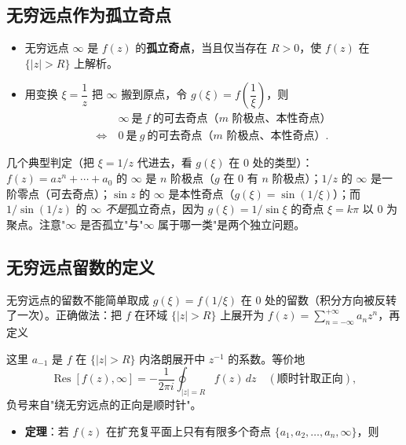 \subsection{无穷远点作为孤立奇点}

\begin{itemize}
    \item 无穷远点 \(\infty\) 是 \(f(z)\) 的\textbf{孤立奇点}，当且仅当存在 \(R>0\)，使 \(f(z)\) 在 \(\{|z|>R\}\) 上解析。
    \item 用变换 \(\xi=\dfrac{1}{z}\) 把 \(\infty\) 搬到原点，令 \(g(\xi)=f\!\left(\dfrac{1}{\xi}\right)\)，则
    \[
    \begin{aligned}
    &\infty\ \text{是}\ f\ \text{的可去奇点（}m\text{ 阶极点、本性奇点）}\\
    \iff\ &0\ \text{是}\ g\ \text{的可去奇点（}m\text{ 阶极点、本性奇点）}.
    \end{aligned}
    \]
\end{itemize}

几个典型判定（把 \(\xi=1/z\) 代进去，看 \(g(\xi)\) 在 \(0\) 处的类型）：\(f(z)=az^n+\cdots+a_0\) 的 \(\infty\) 是 \(n\) 阶极点（\(g\) 在 \(0\) 有 \(n\) 阶极点）；\(1/z\) 的 \(\infty\) 是一阶零点（可去奇点）；\(\sin z\) 的 \(\infty\) 是本性奇点（\(g(\xi)=\sin(1/\xi)\)）；而 \(1/\sin(1/z)\) 的 \(\infty\) \emph{不是}孤立奇点，因为 \(g(\xi)=1/\sin\xi\) 的奇点 \(\xi=k\pi\) 以 \(0\) 为聚点。注意"\(\infty\) 是否孤立"与"\(\infty\) 属于哪一类"是两个独立问题。

\subsection{无穷远点留数的定义}

无穷远点的留数不能简单取成 \(g(\xi)=f(1/\xi)\) 在 \(0\) 处的留数（积分方向被反转了一次）。正确做法：把 \(f\) 在环域 \(\{|z|>R\}\) 上展开为 \(f(z)=\sum_{n=-\infty}^{+\infty}a_n z^n\)，再定义


这里 \(a_{-1}\) 是 \(f\) 在 \(\{|z|>R\}\) 内洛朗展开中 \(z^{-1}\) 的系数。等价地
\[
\operatorname{Res}[f(z),\infty]=-\frac{1}{2\pi i}\oint_{|z|=R}f(z)\,dz\quad(\text{顺时针取正向}),
\]
负号来自"绕无穷远点的正向是顺时针"。

\begin{itemize}
    \item \textbf{定理}：若 \(f(z)\) 在扩充复平面上只有有限多个奇点 \(\{a_1,a_2,\dots,a_n,\infty\}\)，则
\end{itemize}

